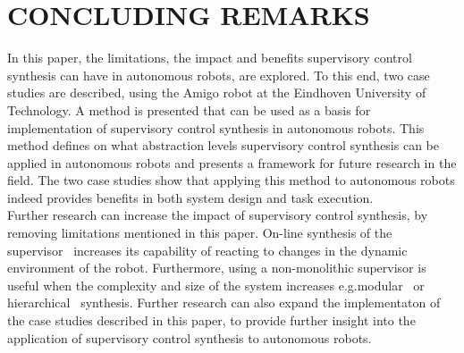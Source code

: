\section{CONCLUDING REMARKS}\label{sec:conclusions}

In this paper, the limitations, the impact and benefits supervisory control synthesis can have in autonomous robots, are explored.
To this end, two case studies are described, using the Amigo robot at the Eindhoven University of Technology. 
A method is presented that can be used as a basis for implementation of supervisory control synthesis in autonomous robots.
This method defines on what abstraction levels supervisory control synthesis can be applied in autonomous robots and presents a framework for future research in the field.
The two case studies show that applying this method to autonomous robots indeed provides benefits in both system design and task execution.\\
Further research can increase the impact of supervisory control synthesis, by removing limitations mentioned in this paper.
On-line synthesis of the supervisor~\cite{online_partially_observed,online_near_optimal,online_sup_rep_obs_sub} increases its capability of reacting to changes in the dynamic environment of the robot.
Furthermore, using a non-monolithic supervisor is useful when the complexity and size of the system increases e.g.\@ modular~\cite{modular} or hierarchical~\cite{hierachical} synthesis.
Further research can also expand the implementaton of the case studies described in this paper, to provide further insight into the application of supervisory control synthesis to autonomous robots.\\


